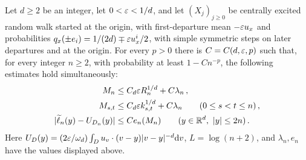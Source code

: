 \begin{lemma}\label{lem:local}
Let $d\geq2$ be an integer, let $0<\varepsilon<1/d$, and let $(X_j)_{j\geq0}$ be
centrally excited random walk started at the origin, with first-departure mean $-\varepsilon u_x$
and probabilities $q_x(\pm e_i)=1/(2d)\mp\varepsilon u_x^i/2$,
with simple symmetric steps on later departures and at the origin.
For every $p>0$ there is $C=C(d,\varepsilon,p)$ such that, for every integer
$n\geq2$, with probability at least $1-Cn^{-p}$, the following estimates
hold simultaneously:
\begin{align}
M_n&\leq C_d\varepsilon R_n^{1/d}+C\lambda_n\, ,\label{eq:M}\\
M_{s,t}&\leq C_d\varepsilon k_{s,t}^{1/d}+C\lambda_n
\qquad(0\leq s<t\leq n)\, ,\label{eq:interval}\\
|\widetilde\ell_n(y)-U_{D_n}(y)|&\leq C e_n(M_n)
\qquad(y\in\mathbb R^d,\ |y|\leq2n)\, .\label{eq:approx}
\end{align}
Here $U_D(y)=(2\varepsilon/\omega_d)\int_D u_v\cdot(v-y)|v-y|^{-d}\mathrm d v$,
$L=\log(n+2)$, and $\lambda_n,e_n$ have the values displayed above.
\end{lemma}

